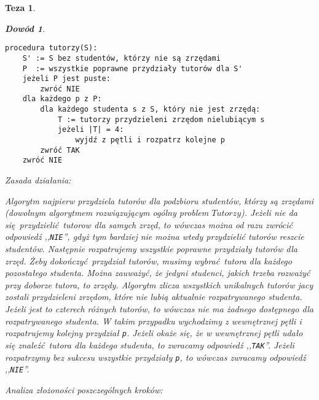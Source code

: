 \documentclass[12pt]{article}
\newtheorem*{theorem*}{Teza}
\newtheorem*{proof*}{Dowód}
\begin{document}
\begin{titlepage}
\begin{theorem*}
\begin{proof*}
\begin{verbatim}
procedura tutorzy(S):
    S' := S bez studentów, którzy nie są zrzędami
    P  := wszystkie poprawne przydziały tutorów dla S'
    jeżeli P jest puste:
        zwróć NIE
    dla każdego p z P:
        dla każdego studenta s z S, który nie jest zrzędą:
            T := tutorzy przydzieleni zrzędom nielubiącym s
            jeżeli |T| = 4:
                wyjdź z pętli i rozpatrz kolejne p
        zwróć TAK
    zwróć NIE
\end{verbatim}

$ $\\
Zasada działania:

Algorytm najpierw przydziela tutorów dla podzbioru 
studentów, którzy są  zrzędami (dowolnym algorytmem rozwiązującym ogólny 
problem $Tutorzy$). Jeżeli nie da się przydzielić tutorow 
dla samych zrzęd, to wówczas można od razu 
zwrócić odpowiedź ,,\texttt{NIE}'', gdyż tym bardziej nie można wtedy 
przydzielić tutorów reszcie studentów. Następnie rozpatrujemy wszystkie 
poprawne przydziały tutorów dla zrzęd. Żeby dokończyć przydział tutorów, musimy 
wybrać tutora dla każdego pozostałego studenta. Można zauważyć, że jedyni 
studenci, jakich trzeba rozważyć przy doborze tutora, to zrzędy. Algorytm 
zlicza wszystkich unikalnych tutorów jacy zostali przydzieleni zrzędom, które 
nie lubią aktualnie rozpatrywanego studenta. Jeżeli jest to czterech różnych 
tutorów, to wówczas nie ma żadnego dostępnego dla rozpatrywanego studenta. W 
takim przypadku wychodzimy z wewnętrznej pętli i rozpatrujemy kolejny przydział 
\texttt{p}. Jeżeli okaże się, że w wewnętrznej pętli udało się znaleźć tutora dla każdego studenta, to zwracamy odpowiedź ,,\texttt{TAK}''. Jeżeli rozpatrzymy bez sukcesu wszystkie przydziały \texttt{p}, to wówczas zwracamy odpowiedź ,,\texttt{NIE}''.

$ $\\
$ $\\
$ $\\
Analiza złożoności poszczególnych kroków:


\end{proof*}
\end{theorem*}
\end{titlepage}
\end{document}

